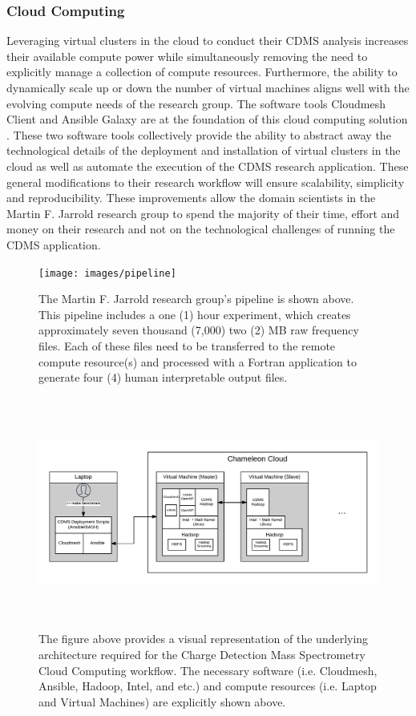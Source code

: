 \documentclass[9pt,twocolumn,twoside]{../../styles/osajnl}
\begin{document}
\subsubsection{Cloud Computing}
Leveraging virtual clusters in the cloud to conduct their CDMS
analysis increases their available compute power while simultaneously
removing the need to explicitly manage a collection of compute
resources. Furthermore, the ability to dynamically scale up or down
the number of virtual machines aligns well with the evolving compute
needs of the research group. The software tools Cloudmesh Client and
Ansible Galaxy are at the foundation of this cloud computing solution
\cite{www-ansible-galaxy, www-cloudmesh}. These two software tools
collectively provide the ability to abstract away the technological
details of the deployment and installation of virtual clusters in the
cloud as well as automate the execution of the CDMS research
application. These general modifications to their research workflow
will ensure scalability, simplicity and reproducibility. These
improvements allow the domain scientists in the Martin F. Jarrold
research group to spend the majority of their time, effort and money
on their research and not on the technological challenges of running
the CDMS application.

\begin{figure}
\centering
\texttt{[image: images/pipeline]}
\caption{The Martin F. Jarrold research group's pipeline is shown
  above. This pipeline includes a one (1) hour experiment, which
  creates approximately seven thousand (7,000) two (2) MB raw
  frequency files. Each of these files need to be transferred to the
  remote compute resource(s) and processed with a Fortran application
  to generate four (4) human interpretable output files.}
\label{fig:pipeline}
\end{figure}

\begin{figure}[h]
\centering
\includegraphics[height=3.0in, width=\textwidth]{images/architecture}
\caption{The figure above provides a visual representation of the
  underlying architecture required for the Charge Detection Mass
  Spectrometry Cloud Computing workflow. The necessary software
  (i.e. Cloudmesh, Ansible, Hadoop, Intel, and etc.) and compute
  resources (i.e. Laptop and Virtual Machines) are explicitly shown
  above.}
\end{figure}
\end{document}
